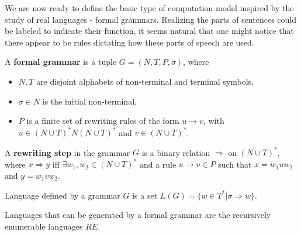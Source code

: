 We are now ready to define the basic type of computation model inspired by the study of real languages - formal grammars. Realizing the parts of sentences could be labeled to indicate their function, it seems natural that one might notice that there appear to be rules dictating how these parts of speech are used.
\begin{definition}
A  {\bf formal grammar} is a tuple $G = (N,T,P,\sigma)$, where
\begin{itemize}
  \item $N, T$ are disjoint alphabets of non-terminal and terminal symbols,
  \item $\sigma\in N$ is the initial non-terminal,
  \item $P$ is a finite set of rewriting rules of the form $u\rightarrow v$, with $u\in (N\cup T)^*N(N\cup T)^*$ and $v\in (N\cup T)^*$.
\end{itemize}
\end{definition}

\begin{definition}
A {\bf rewriting step} in the grammar $G$ is a binary relation $\Rightarrow$ on $(N\cup T)^*$, where $x\Rightarrow y$ iff $\exists w_1, w_2\in (N\cup T)^*$ and a rule $u\rightarrow v \in P$ such that $x=w_1uw_2$ and $y=w_1vw_2$.
\end{definition}

\begin{definition}
 Language defined by a grammar $G$ is a set $L(G)=\{w\in T^*|\sigma\Rightarrow w\}$.
\end{definition}

Languages that can be generated by a formal grammar are the  recursively enumerable languages $RE$.
